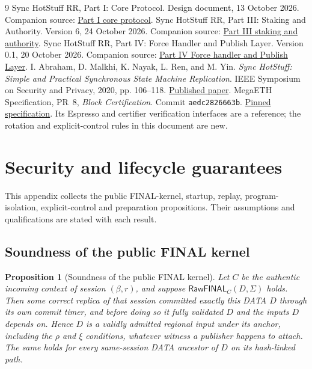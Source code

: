 \documentclass[11pt,a4paper]{article}
\newcommand{\tagg}[1]{\ensuremath{\mathsf{#1}}}
\newtheorem{proposition}[proposition]{Proposition}
\newcounter{protocol}
\begin{document}
\begingroup\small
\begin{thebibliography}{9}
Sync HotStuff RR, Part I: Core Protocol. Design document, 13 October 2026.
Companion source: \href{run:sync_hotstuff_rr_part1_core.tex}{Part I core protocol}.
Sync HotStuff RR, Part III: Staking and Authority. Version 6, 24 October 2026.
Companion source: \href{run:sync_hotstuff_rr_part3_staking_v6.tex}{Part III staking and authority}.
Sync HotStuff RR, Part IV: Force Handler and Publish Layer.
Version 0.1, 20 October 2026.
Companion source: \href{run:sync_hotstuff_rr_part4_force_v0_1.tex}{Part IV Force handler and Publish Layer}.
I. Abraham, D. Malkhi, K. Nayak, L. Ren, and M. Yin.
\emph{Sync HotStuff: Simple and Practical Synchronous State Machine Replication}.
IEEE Symposium on Security and Privacy, 2020, pp. 106--118.
\href{https://conferences.computer.org/sp/pdfs/sp/2020/349700a106.pdf}{Published paper}.
MegaETH Specification, PR~8, \emph{Block Certification}.
Commit \texttt{aedc2826663b}.
\href{https://github.com/megaeth-labs/specification/tree/aedc2826663b134ee25d26bea17e70c6d23d321c/specs/block-certification}{Pinned specification}.
Its Espresso and certifier verification interfaces are a reference;
the rotation and explicit-control rules in this document are new.
\end{thebibliography}
\endgroup
\appendix
{}
\section{Security and lifecycle guarantees}
\label{app:security}
This appendix collects the public FINAL-kernel, startup, replay,
program-isolation, explicit-control and preparation propositions.
Their assumptions and qualifications are stated with each result.

\subsection{Soundness of the public FINAL kernel}
\label{app:final-kernel-proof}
\begin{proposition}[Soundness of the public FINAL kernel]
\label{prop:final-kernel-soundness}
Let $C$ be the authentic incoming context of session $(\beta,r)$, and
suppose $\tagg{RawFINAL}_C(D,\Sigma)$ holds. Then some correct replica of
that session committed exactly this DATA $D$ through its own commit
timer, and before doing so it fully validated $D$ and the inputs $D$
depends on. Hence $D$ is a validly admitted regional input under its
anchor, including the $\rho$ and $\xi$ conditions, whatever witness a
publisher happens to attach. The same holds for every same-session DATA
ancestor of $D$ on its hash-linked path.
\end{proposition}
\end{document}
